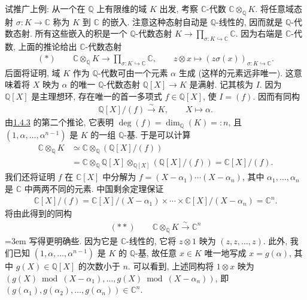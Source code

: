 \begin{example*}
试推广上例: 从一个在 $\mathbb Q$ 上有限维的域 $K$ 出发, 考察 $\mathbb C$-代数 $\mathbb C\otimes_{\mathbb Q}K$. 将任意域态射 $\sigma:K\longrightarrow\mathbb C$ 称为 $K$ 到 $\mathbb C$ 的嵌入. 注意这种态射自动是 $\mathbb Q$-线性的, 因而就是 $\mathbb Q$-代数态射. 所有这些嵌入的积是一个 $\mathbb Q$-代数态射 $K\longrightarrow\prod_{\sigma:K\hookrightarrow\mathbb C}\mathbb C$. 因为右端是 $\mathbb C$-代数, 上面的推论给出 $\mathbb C$-代数态射
\begin{align*}
(*)\qquad\mathbb C\otimes_{\mathbb Q}K\longrightarrow\prod_{\sigma:K\hookrightarrow\mathbb C}\mathbb C,
\qquad z\otimes x\mapsto(z\sigma(x))_{\sigma:K\hookrightarrow\mathbb C}.
\end{align*}
后面将证明, 域 $K$ 作为 $\mathbb Q$-代数可由一个元素 $\alpha$ 生成 (这样的元素远非唯一). 这意味着将 $X$ 映为 $\alpha$ 的唯一 $\mathbb Q$-代数态射 $\mathbb Q[X]\longrightarrow K$ 是满射. 记其核为 $I$. 因为 $\mathbb Q[X]$ 是主理想环, 存在唯一的首一多项式 $f\in\mathbb Q[X]$, 使 $I=(f)$. 因而有同构
\begin{align*}
\mathbb Q[X]/(f)\xrightarrow{\sim}K,\qquad X\mapsto\alpha.
\end{align*}
由\hyperref[sec:galois-1-4-3]{1.4.3} 的第二个推论, 它表明 $\deg(f)=\dim_{\mathbb Q}(K)=:n$, 且 $(1,\alpha,\ldots,\alpha^{n-1})$ 是 $K$ 的一组 $\mathbb Q$-基. 于是可以计算
\begin{align*}
\mathbb C\otimes_{\mathbb Q}K
&\simeq\mathbb C\otimes_{\mathbb Q}(\mathbb Q[X]/(f))\\
&=\mathbb C\otimes_{\mathbb Q}\mathbb Q[X]\otimes_{\mathbb Q[X]}(\mathbb Q[X]/(f))
=\mathbb C[X]/(f).
\end{align*}
我们还将证明 $f$ 在 $\mathbb C[X]$ 中分解为 $f=(X-\alpha_1)\cdots(X-\alpha_n)$, 其中 $\alpha_1,\ldots,\alpha_n$ 是 $\mathbb C$ 中两两不同的元素. 中国剩余定理保证
\begin{align*}
\mathbb C[X]/(f)=\mathbb C[X]/(X-\alpha_1)\times\cdots\times\mathbb C[X]/(X-\alpha_n)=\mathbb C^n.
\end{align*}
将由此得到的同构
\begin{align*}
(**)\qquad\mathbb C\otimes_{\mathbb Q}K\xrightarrow{\sim}\mathbb C^n
\end{align*}
\begingroup\emergencystretch=3em
写得更明确些. 因为它是 $\mathbb C$-线性的, 它将 $z\otimes1$ 映为 $(z,z,\ldots,z)$. 此外, 我们已知 $(1,\alpha,\ldots,\alpha^{n-1})$ 是 $K$ 的 $\mathbb Q$-基, 故任意 $x\in K$ 唯一地写成 $x=g(\alpha)$, 其中 $g(X)\in\mathbb Q[X]$ 的次数小于 $n$. 可以看到, 上述同构将 $1\otimes x$ 映为 $(g(X)\bmod(X-\alpha_1),\ldots,g(X)\bmod(X-\alpha_n))$, 即 $(g(\alpha_1),g(\alpha_2),\ldots,g(\alpha_n))\in\mathbb C^n$.
\par\endgroup


\end{example*}
